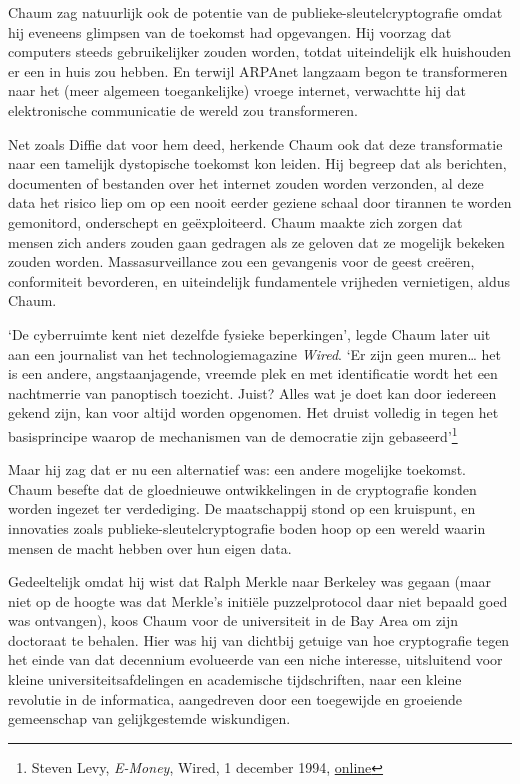 \documentclass[
  a5paper,
  smalldemyvopaper,11pt,twoside,onecolumn,openright,extrafontsizes,
hidelinks]{memoir}
\begin{document}
Chaum zag natuurlijk ook de potentie van de publieke-sleutelcryptografie
omdat hij eveneens glimpsen van de toekomst had opgevangen. Hij voorzag
dat computers steeds gebruikelijker zouden worden, totdat uiteindelijk
elk huishouden er een in huis zou hebben. En terwijl ARPAnet langzaam
begon te transformeren naar het (meer algemeen toegankelijke) vroege
internet, verwachtte hij dat elektronische communicatie de wereld zou
transformeren.

Net zoals Diffie dat voor hem deed, herkende Chaum ook dat deze
transformatie naar een tamelijk dystopische toekomst kon leiden. Hij
begreep dat als berichten, documenten of bestanden over het internet
zouden worden verzonden, al deze data het risico liep om op een nooit
eerder geziene schaal door tirannen te worden gemonitord, onderschept en
geëxploiteerd. Chaum maakte zich zorgen dat mensen zich anders zouden
gaan gedragen als ze geloven dat ze mogelijk bekeken zouden worden.
Massasurveillance zou een gevangenis voor de geest creëren, conformiteit
bevorderen, en uiteindelijk fundamentele vrijheden vernietigen, aldus
Chaum.

`De cyberruimte kent niet dezelfde fysieke beperkingen', legde Chaum
later uit aan een journalist van het technologiemagazine \emph{Wired}.
`Er zijn geen muren\ldots{} het is een andere, angstaanjagende, vreemde
plek en met identificatie wordt het een nachtmerrie van panoptisch
toezicht. Juist? Alles wat je doet kan door iedereen gekend zijn, kan
voor altijd worden opgenomen. Het druist volledig in tegen het
basisprincipe waarop de mechanismen van de democratie zijn
gebaseerd'\footnote{Steven Levy, \emph{E-Money}, Wired, 1 december 1994,
  \href{https://www.wired.com/1994/12/emoney/.}{online}}

Maar hij zag dat er nu een alternatief was: een andere mogelijke
toekomst. Chaum besefte dat de gloednieuwe ontwikkelingen in de
cryptografie konden worden ingezet ter verdediging. De maatschappij
stond op een kruispunt, en innovaties zoals publieke-sleutelcryptografie
boden hoop op een wereld waarin mensen de macht hebben over hun eigen
data.

Gedeeltelijk omdat hij wist dat Ralph Merkle naar Berkeley was gegaan
(maar niet op de hoogte was dat Merkle's initiële puzzelprotocol daar
niet bepaald goed was ontvangen), koos Chaum voor de universiteit in de
Bay Area om zijn doctoraat te behalen. Hier was hij van dichtbij getuige
van hoe cryptografie tegen het einde van dat decennium evolueerde van
een niche interesse, uitsluitend voor kleine universiteitsafdelingen en
academische tijdschriften, naar een kleine revolutie in de informatica,
aangedreven door een toegewijde en groeiende gemeenschap van
gelijkgestemde wiskundigen.
\end{document}
